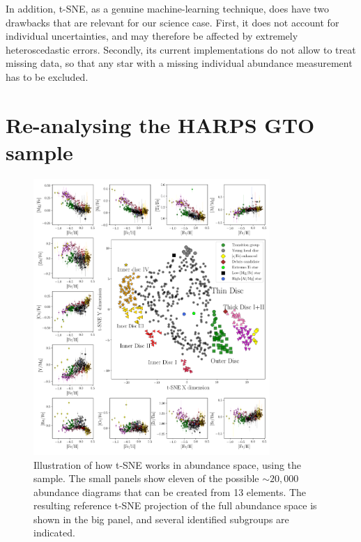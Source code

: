 \documentclass{aa}  %
\begin{document}
In addition, t-SNE, as a genuine machine-learning technique, does have two drawbacks that are relevant for our science case. First, it does not account for individual uncertainties, and may therefore be affected by extremely heteroscedastic errors. Secondly, its current implementations do not allow to treat missing data, so that any star with a missing individual abundance measurement has to be excluded. 

\section{Re-analysing the HARPS GTO sample}\label{harps}

\begin{figure}\centering
 \includegraphics[width=0.8\textwidth]{im/harps_tsne-abundsplot_teffcut.png}
\caption{Illustration of how t-SNE works in abundance space, using the \citet{DelgadoMena2017} sample. The small panels show eleven of the possible $\sim20,000$ abundance diagrams that can be created from 13 elements. The resulting reference t-SNE projection of the full abundance space is shown in the big panel, and several identified subgroups are indicated.}
\label{harps0}
\end{figure}
\end{document}
